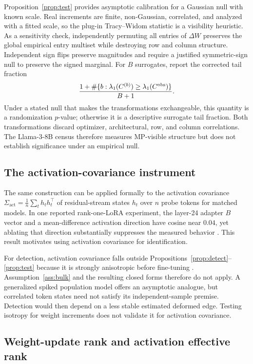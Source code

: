 \documentclass[11pt]{article}
\theoremstyle{definition}
\theoremstyle{remark}
\newcommand{\dW}{\Delta W}
\begin{document}
Proposition~\ref{prop:test} provides asymptotic calibration for a Gaussian null with known
scale. Real increments are finite, non-Gaussian, correlated, and analyzed with a fitted
scale, so the plug-in Tracy--Widom statistic is a visibility heuristic. As a sensitivity
check, independently permuting all entries of $\dW$ preserves the global empirical entry
multiset while destroying row and column structure. Independent sign flips preserve
magnitudes and require a justified symmetric-sign null to preserve the signed marginal.
For $B$ surrogates, report the corrected tail fraction
\[
  \frac{1+\#\{b:\lambda_1(C^{(b)})\ge\lambda_1(C^{\rm obs})\}}{B+1}.
\]
Under a stated null that makes the transformations exchangeable, this quantity is a
randomization $p$-value; otherwise it is a descriptive surrogate tail fraction. Both
transformations discard optimizer, architectural, row, and column correlations.
The Llama-3-8B census therefore measures MP-visible structure but does not
establish significance under an empirical null.

\subsection{The activation-covariance instrument}
\label{sec:activation}

The same construction can be applied formally to the activation covariance
$\Sigma_{\mathrm{act}} = \tfrac1n \sum_{t} h_t h_t^{\!\top}$ of residual-stream states
$h_t$ over $n$ probe tokens for matched models. In one reported rank-one-LoRA
experiment, the layer-24 adapter $B$ vector and a mean-difference activation
direction have cosine near $0.04$, yet ablating that direction substantially
suppresses the measured behavior \cite{soligo2025}. This result motivates using
activation covariance for identification.

For detection, activation covariance falls outside
Propositions~\ref{prop:detect}--\ref{prop:test} because it is strongly anisotropic
before fine-tuning \cite{sun2024,gao2019,ethayarajh2019}. Assumption~\ref{ass:bulk}
and the resulting closed forms therefore do not apply. A generalized spiked
population model \cite{baiyao2012} offers an asymptotic analogue, but correlated
token states need not satisfy its independent-sample premise. Detection would
then depend on a less stable estimated deformed edge. Testing isotropy for weight
increments does not validate it for activation covariance.

\subsection{Weight-update rank and activation effective rank}
\label{sec:larf}
\end{document}
